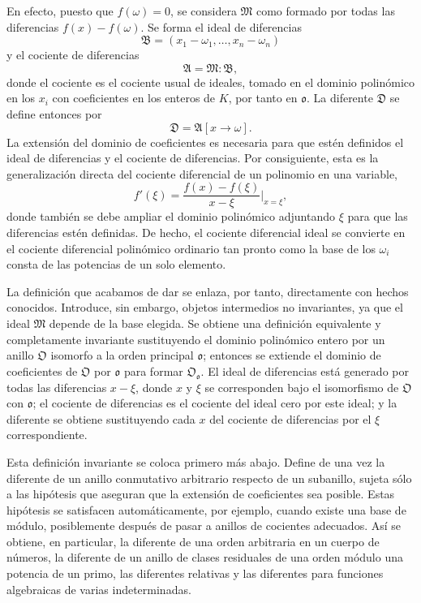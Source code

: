 \documentclass[11pt]{article}
\begin{document}
En efecto, puesto que $f(\omega)=0$, se considera $\mathfrak M$ como formado por todas las diferencias $f(x)-f(\omega)$. Se forma el ideal de diferencias
\[
        \mathfrak B=(x_1-\omega_1,\ldots,x_n-\omega_n)
\]
y el cociente de diferencias
\[
        \mathfrak A=\mathfrak M:\mathfrak B,
\]
donde el cociente es el cociente usual de ideales, tomado en el dominio polinómico en los $x_i$ con coeficientes en los enteros de $K$, por tanto en $\mathfrak o$. La diferente $\mathfrak D$ se define entonces por
\[
        \mathfrak D=\mathfrak A[x\to\omega].
\]
La extensión del dominio de coeficientes es necesaria para que estén definidos el ideal de diferencias y el cociente de diferencias. Por consiguiente, esta es la generalización directa del cociente diferencial de un polinomio en una variable,
\[
        f'(\xi)=\frac{f(x)-f(\xi)}{x-\xi}\bigg|_{x=\xi},
\]
donde también se debe ampliar el dominio polinómico adjuntando $\xi$ para que las diferencias estén definidas. De hecho, el cociente diferencial ideal se convierte en el cociente diferencial polinómico ordinario tan pronto como la base de los $\omega_i$ consta de las potencias de un solo elemento.

La definición que acabamos de dar se enlaza, por tanto, directamente con hechos conocidos. Introduce, sin embargo, objetos intermedios no invariantes, ya que el ideal $\mathfrak M$ depende de la base elegida. Se obtiene una definición equivalente y completamente invariante sustituyendo el dominio polinómico entero por un anillo $\mathfrak O$ isomorfo a la orden principal $\mathfrak o$; entonces se extiende el dominio de coeficientes de $\mathfrak O$ por $\mathfrak o$ para formar $\mathfrak O_{\mathfrak o}$. El ideal de diferencias está generado por todas las diferencias $x-\xi$, donde $x$ y $\xi$ se corresponden bajo el isomorfismo de $\mathfrak O$ con $\mathfrak o$; el cociente de diferencias es el cociente del ideal cero por este ideal; y la diferente se obtiene sustituyendo cada $x$ del cociente de diferencias por el $\xi$ correspondiente.

Esta definición invariante se coloca primero más abajo. Define de una vez la diferente de un anillo conmutativo arbitrario respecto de un subanillo, sujeta sólo a las hipótesis que aseguran que la extensión de coeficientes sea posible. Estas hipótesis se satisfacen automáticamente, por ejemplo, cuando existe una base de módulo, posiblemente después de pasar a anillos de cocientes adecuados. Así se obtiene, en particular, la diferente de una orden arbitraria en un cuerpo de números, la diferente de un anillo de clases residuales de una orden módulo una potencia de un primo, las diferentes relativas y las diferentes para funciones algebraicas de varias indeterminadas.
\end{document}
